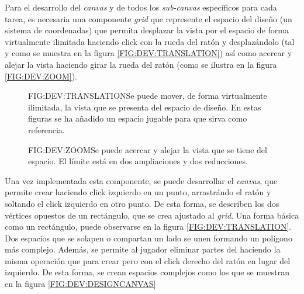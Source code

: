 Para el desarrollo del \textit{canvas} y de todos los \textit{sub-canvas} específicos para cada tarea, es necesaria una componente \textit{grid} que represente el espacio del diseño (un sistema de coordenadas) que permita desplazar la vista por el espacio de forma virtualmente ilimitada haciendo click con la rueda del ratón y desplazándolo (tal y como se muestra en la figura \ref{FIG:DEV:TRANSLATION}) así como acercar y alejar la vista haciendo girar la rueda del ratón (como se ilustra en la figura \ref{FIG:DEV:ZOOM}).

\begin{figure}{FIG:DEV:TRANSLATION}{Se puede mover, de forma virtualmente ilimitada, la vista que se presenta del espacio de diseño. En estas figuras se ha añadido un espacio jugable para que sirva como referencia.}
	 \quad
\end{figure}

\begin{figure}{FIG:DEV:ZOOM}{Se puede acercar y alejar la vista que se tiene del espacio. El límite está en dos ampliaciones y dos reducciones.}
	 \quad
	 \quad
\end{figure}

Una vez implementada esta componente, se puede desarrollar el \textit{canvas}, que permite crear  haciendo click izquierdo en un punto, arrastrándo el ratón y soltando el click izquierdo en otro punto. De esta forma, se describen los dos vértices opuestos de un rectángulo, que se crea ajustado al \textit{grid}. Una forma básica como un rectángulo, puede observarse en la figura \ref{FIG:DEV:TRANSLATION}. Dos espacios que se solapen o compartan un lado se unen formando un polígono más complejo.
Además, se permite al jugador eliminar partes del  haciendo la misma operación que para crear pero con el click derecho del ratón en lugar del izquierdo.
De esta forma, se crean espacios complejos como los que se muestran en la figura \ref{FIG:DEV:DESIGNCANVAS}

